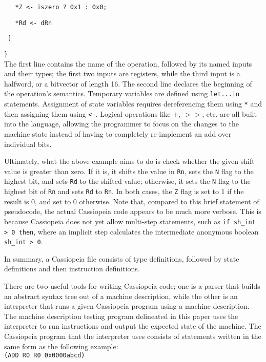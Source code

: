 \documentclass[letterpaper,12pt]{article}
\begin{document}
\texttt{\ \ \ *Z <- iszero ? 0x1 : 0x0;}

\texttt{\ \ \ *Rd <- dRn}

\texttt{\ ]}

\texttt{\}}\\

The first line contains the name of the operation, followed by its named inputs and their types; the first two inputs are registers, while the third input is a halfword, or a bitvector of length 16. The second line declares the beginning of the operation's semantics. Temporary variables are defined using \texttt{let...in} statements. Assignment of state variables requires dereferencing them using \texttt{*} and then assigning them using \texttt{<-}. Logical operations like +, $>>$, etc. are all built into the language, allowing the programmer to focus on the changes to the machine state instead of having to completely re-implement an add over individual bits.

Ultimately, what the above example aims to do is check whether the given shift value is greater than zero. If it is, it shifts the value in \texttt{Rn}, sets the \texttt{N} flag to the highest bit, and sets \texttt{Rd} to the shifted value; otherwise, it sets the \texttt{N} flag to the highest bit of \texttt{Rn} and sets \texttt{Rd} to \texttt{Rn}. In both cases, the \texttt{Z} flag is set to 1 if the result is 0, and set to 0 otherwise. Note that, compared to this brief statement of pseudocode, the actual Cassiopeia code appears to be much more verbose. This is because Cassiopeia does not yet allow multi-step statements, such as \texttt{if sh\_int > 0 then}, where an implicit step calculates the intermediate anonymous boolean \texttt{sh\_int > 0}.

In summary, a Cassiopeia file consists of type definitions, followed by state definitions and then instruction definitions.

There are two useful tools for writing Cassiopeia code; one is a parser that builds an abstract syntax tree out of a machine description, while the other is an interpreter that runs a given Cassiopeia program using a machine description. The machine description testing program delineated in this paper uses the interpreter to run instructions and output the expected state of the machine. The Cassiopeia program that the interpreter uses consists of statements written in the same form as the following example:\\

\texttt{(ADD R0 R0 0x0000abcd)}
\end{document}
